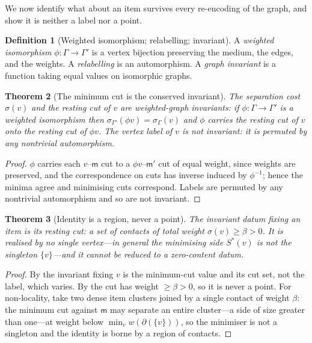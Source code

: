 \documentclass[11pt,twocolumn,a4paper]{article}
\theoremstyle{dirthm}
\newtheorem{theorem}{Theorem}[section]
\theoremstyle{definition}
\newtheorem{definition}[theorem]{Definition}
\theoremstyle{remark}
\newcommand{\Gph}{\Gamma}
\newcommand{\wt}{w}
\newcommand{\med}{\mathsf{m}}
\newcommand{\flo}{\beta}
\newcommand{\cut}{\partial}
\newcommand{\str}{\sigma}
\newcommand{\set}[1]{\{#1\}}
\begin{document}
We now identify what about an item survives every re-encoding of the graph,
and show it is neither a label nor a point.

\begin{definition}[Weighted isomorphism; relabelling; invariant]
\label{def:iso}
A \emph{weighted isomorphism} $\phi\colon\Gph\to\Gph'$ is a vertex bijection
preserving the medium, the edges, and the weights. A \emph{relabelling} is an
automorphism. A \emph{graph invariant} is a function taking equal values on
isomorphic graphs.
\end{definition}

\begin{theorem}[The minimum cut is the conserved invariant]
\label{thm:invariant}
The separation cost $\str(v)$ and the resting cut of $v$ are weighted-graph
invariants: if $\phi\colon\Gph\to\Gph'$ is a weighted isomorphism then
$\str_{\Gph'}(\phi v)=\str_{\Gph}(v)$ and $\phi$ carries the resting cut of
$v$ onto the resting cut of $\phi v$. The vertex label of $v$ is not
invariant: it is permuted by any nontrivial automorphism.
\end{theorem}

\begin{proof}
$\phi$ carries each $v$--$\med$ cut to a $\phi v$--$\med'$ cut of equal
weight, since weights are preserved, and the correspondence on cuts has
inverse induced by $\phi^{-1}$; hence the minima agree and minimising cuts
correspond. Labels are permuted by any nontrivial automorphism and so are not
invariant.
\end{proof}

\begin{theorem}[Identity is a region, never a point]
\label{thm:region}
The invariant datum fixing an item is its resting cut: a set of contacts of
total weight $\str(v)\ge\flo>0$. It is realised by no single vertex---in
general the minimising side $S^{\ast}(v)$ is not the singleton
$\set{v}$---and it cannot be reduced to a zero-content datum.
\end{theorem}

\begin{proof}
By  the invariant fixing $v$ is the minimum-cut value and
its cut set, not the label, which varies. By  the cut has
weight $\ge\flo>0$, so it is never a point. For non-locality, take two dense
item clusters joined by a single contact of weight $\flo$: the minimum cut
against $\med$ may separate an entire cluster---a side of size greater than
one---at weight below $\min_v\wt(\cut(\set{v}))$, so the minimiser is not a
singleton and the identity is borne by a region of contacts.
\end{proof}
\end{document}
